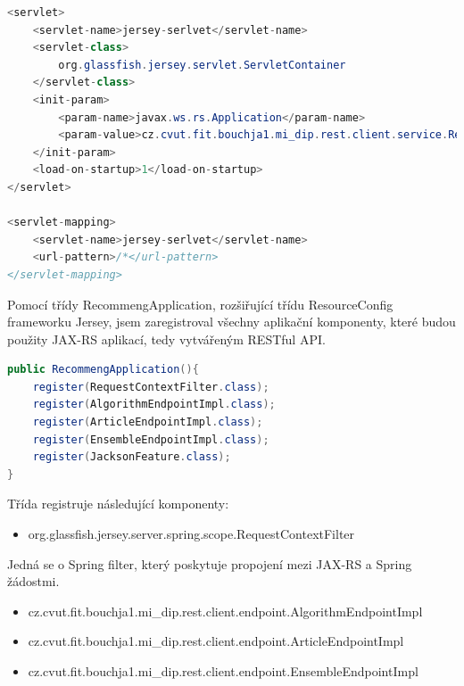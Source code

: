 \documentclass[thesis=M,czech]{FITthesis}[2014/05/07]
\begin{document}
\begin{lstlisting}[language=java]
<servlet>
    <servlet-name>jersey-serlvet</servlet-name>
    <servlet-class>
        org.glassfish.jersey.servlet.ServletContainer
    </servlet-class>
    <init-param>
        <param-name>javax.ws.rs.Application</param-name>
        <param-value>cz.cvut.fit.bouchja1.mi_dip.rest.client.service.RecommengApplication</param-value>            
    </init-param>        
    <load-on-startup>1</load-on-startup>
</servlet>

<servlet-mapping>
    <servlet-name>jersey-serlvet</servlet-name>
    <url-pattern>/*</url-pattern>
</servlet-mapping>
\end{lstlisting}

Pomocí třídy RecommengApplication, rozšiřující třídu ResourceConfig frameworku Jersey, jsem zaregistroval všechny aplikační komponenty, které budou použity JAX-RS aplikací, tedy vytvářeným RESTful API.

\begin{lstlisting}[language=java]
public RecommengApplication(){
    register(RequestContextFilter.class);
    register(AlgorithmEndpointImpl.class);
    register(ArticleEndpointImpl.class);
    register(EnsembleEndpointImpl.class);
    register(JacksonFeature.class);        
}
\end{lstlisting}

Třída registruje následující komponenty:

\begin{itemize}
	\item org.glassfish.jersey.server.spring.scope.RequestContextFilter
\end{itemize}
	Jedná se o Spring filter, který poskytuje propojení mezi JAX-RS a Spring žádostmi.

\begin{itemize}	
	\item cz.cvut.fit.bouchja1.mi\_dip.rest.client.endpoint.AlgorithmEndpointImpl
\end{itemize}	

\begin{itemize}
	\item cz.cvut.fit.bouchja1.mi\_dip.rest.client.endpoint.ArticleEndpointImpl
\end{itemize}	

\begin{itemize}
	\item cz.cvut.fit.bouchja1.mi\_dip.rest.client.endpoint.EnsembleEndpointImpl
\end{itemize}	
\end{document}
